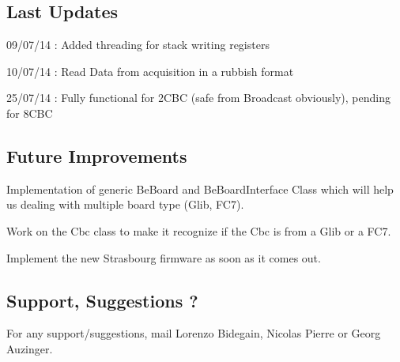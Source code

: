 \subsection*{Last Updates }


\begin{DoxyItemize}
\item 09/07/14 \-: Added threading for stack writing registers
\item 10/07/14 \-: Read Data from acquisition in a rubbish format
\item 25/07/14 \-: Fully functional for 2\-C\-B\-C (safe from Broadcast obviously), pending for 8\-C\-B\-C
\end{DoxyItemize}

\subsection*{Future Improvements }


\begin{DoxyItemize}
\item Implementation of generic Be\-Board and Be\-Board\-Interface Class which will help us dealing with multiple board type (Glib, F\-C7).
\item Work on the Cbc class to make it recognize if the Cbc is from a Glib or a F\-C7.
\item Implement the new Strasbourg firmware as soon as it comes out.
\end{DoxyItemize}

\subsection*{Support, Suggestions ? }

For any support/suggestions, mail Lorenzo Bidegain, Nicolas Pierre or Georg Auzinger. 